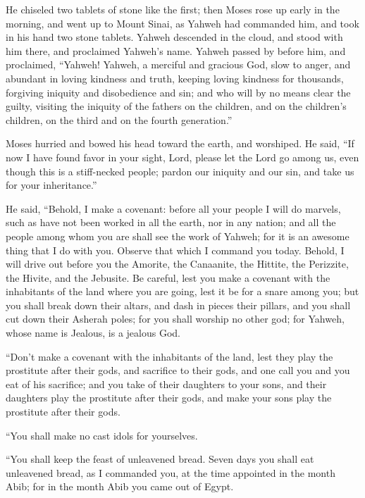  He chiseled two tablets of stone like the first; then Moses
rose up early in the morning, and went up to Mount Sinai, as Yahweh had
commanded him, and took in his hand two stone tablets. 
Yahweh descended in the cloud, and stood with him there, and proclaimed
Yahweh's name.  Yahweh passed by before him, and proclaimed,
``Yahweh! Yahweh, a merciful and gracious God, slow to anger, and
abundant in loving kindness and truth,  keeping loving
kindness for thousands, forgiving iniquity and disobedience and sin; and
who will by no means clear the guilty, visiting the iniquity of the
fathers on the children, and on the children's children, on the third
and on the fourth generation.''

 Moses hurried and bowed his head toward the earth, and
worshiped.  He said, ``If now I have found favor in your
sight, Lord, please let the Lord go among us, even though this is a
stiff-necked people; pardon our iniquity and our sin, and take us for
your inheritance.''

 He said, ``Behold, I make a covenant: before all your
people I will do marvels, such as have not been worked in all the earth,
nor in any nation; and all the people among whom you are shall see the
work of Yahweh; for it is an awesome thing that I do with you.
 Observe that which I command you today. Behold, I will
drive out before you the Amorite, the Canaanite, the Hittite, the
Perizzite, the Hivite, and the Jebusite.  Be careful, lest
you make a covenant with the inhabitants of the land where you are
going, lest it be for a snare among you;  but you shall
break down their altars, and dash in pieces their pillars, and you shall
cut down their Asherah poles;  for you shall worship no
other god; for Yahweh, whose name is Jealous, is a jealous God.

 ``Don't make a covenant with the inhabitants of the land,
lest they play the prostitute after their gods, and sacrifice to their
gods, and one call you and you eat of his sacrifice;  and
you take of their daughters to your sons, and their daughters play the
prostitute after their gods, and make your sons play the prostitute
after their gods.

 ``You shall make no cast idols for yourselves.

 ``You shall keep the feast of unleavened bread. Seven days
you shall eat unleavened bread, as I commanded you, at the time
appointed in the month Abib; for in the month Abib you came out of
Egypt.

